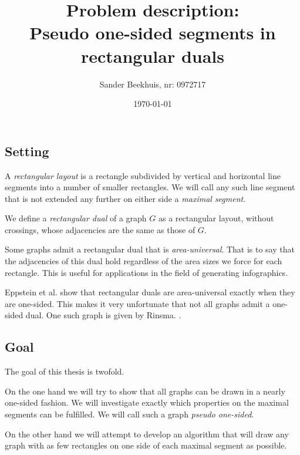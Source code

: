 \documentclass[a4paper]{article}
\title{Problem description:\\ Pseudo one-sided segments in rectangular duals}
\author{Sander Beekhuis, nr: 0972717}
\date{\today} %
\begin{document}
\maketitle

\subsection*{Setting}
A  \emph{rectangular layout} is a rectangle subdivided by vertical and horizontal line segments into a number of smaller rectangles. We will call any such line segment that is not extended any further on either side a \emph{maximal segment}.
 
We define a \emph{rectangular dual} of a graph $G$ as a rectangular layout, without crossings, whose adjacencies are the same as those of $G$.

Some graphs admit a rectangular dual that is \emph{area-universal}. That is to say that the adjacencies of this dual hold regardless of the area sizes we force for each rectangle. This is useful for applications in the field of generating infographics.


Eppstein et al. show that rectangular duals are area-universal exactly when they are one-sided.\cite{Eppstein2012} This makes it very unfortunate that not all graphs admit a one-sided dual. One such graph is given by Rinsma. \cite{Rinsma1987}. 

\subsection*{Goal}
The goal of this thesis is twofold.

On the one hand we will try to show that all graphs can be drawn in a nearly one-sided fashion. We will investigate exactly which properties on the {maximal segments} can be fulfilled. We will call such a graph \emph{pseudo one-sided}.

On the other hand we will attempt to develop an algorithm that will draw any graph with as few rectangles on one side of each {maximal segment} as possible.

{}

\end{document}
